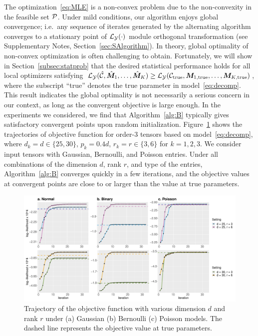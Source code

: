 \documentclass[12pt]{article}
\theoremstyle{definition}
\theoremstyle{definition}
\begin{document}
The optimization~\eqref{eq:MLE} is a non-convex problem due to the non-convexity in the feasible set $\mathcal{P}$. Under mild conditions, our algorithm enjoys global convergence; i.e.\ any sequence of iterates generated by the alternating algorithm converges to a stationary point of $\mathcal{L}_{\mathcal{Y}}(\cdot)$ module orthogonal transformation (see Supplementary Notes, Section~\ref{sec:SAlgorithm}). In theory, global optimality of non-convex optimization is often challenging to obtain. Fortunately, we will show in Section~\ref{subsec:statprob} that the desired statistical performance holds for all local optimizers satisfying $\mathcal{L}_{\mathcal{Y}}(\hat {\mathcal{C}}, \hat {\bm M}_1,\ldots,\hat {\bm M}_K)\geq \mathcal{L}_{\mathcal{Y}} (\mathcal{C}_{\textup{true}},\bm M_{1,\textup{true}},\ldots,\bm M_{K,\textup{true}})$, where the subscript ``true'' denotes the true parameter in model~\eqref{eq:decomp}. This result indicates the global optimality is not necessarily a serious concern in our context, as long as the convergent objective is large enough. In the experiments we considered, we find that Algorithm~\ref{alg:B} typically gives satisfactory convergent points upon random initialization. Figure~\ref{fig:loglike} shows the trajectories of objective function for order-3 tensors based on model~\eqref{eq:decomp}, where $d_k = d \in\{25,30\}$, $p_k = 0.4d$, $r_k = r\in\{3,6\}$ for $ k = 1,2,3$. We consider input tensors with Gaussian, Bernoulli, and Poisson entries. Under all combinations of the dimension $d$, rank $r$, and type of the entries, Algorithm~\ref{alg:B} converges quickly in a few iterations, and the objective values at convergent points are close to or larger than the value at true parameters.  


\begin{figure}[t]
\centering
\includegraphics[width=15cm]{loglike.pdf}
\caption{Trajectory of the objective function with various dimension $d$ and rank $r$ under (a) Gaussian (b) Bernoulli (c) Poisson models. The dashed line represents the objective value at true parameters. }\label{fig:loglike}
\end{figure}
\end{document}
